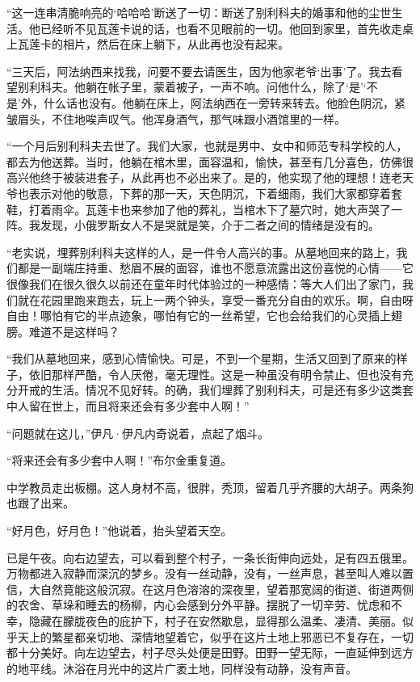 \documentclass[12pt,UTF-8,openany]{ctexbook}
\begin{document}
\begin{normalsize}
    “这一连串清脆响亮的‘哈哈哈’断送了一切：断送了别利科夫的婚事和他的尘世生活。他已经听不见瓦莲卡说的话，也看不见眼前的一切。他回到家里，首先收走桌上瓦莲卡的相片，然后在床上躺下，从此再也没有起来。
    
    “三天后，阿法纳西来找我，问要不要去请医生，因为他家老爷‘出事’了。我去看望别利科夫。他躺在帐子里，蒙着被子，一声不响。问他什么，除了‘是’‘不是’外，什么话也没有。他躺在床上，阿法纳西在一旁转来转去。他脸色阴沉，紧皱眉头，不住地唉声叹气。他浑身酒气，那气味跟小酒馆里的一样。
    
    “一个月后别利科夫去世了。我们大家，也就是男中、女中和师范专科学校的人，都去为他送葬。当时，他躺在棺木里，面容温和，愉快，甚至有几分喜色，仿佛很高兴他终于被装进套子，从此再也不必出来了。是的，他实现了他的理想！连老天爷也表示对他的敬意，下葬的那一天，天色阴沉，下着细雨，我们大家都穿着套鞋，打着雨伞。瓦莲卡也来参加了他的葬礼，当棺木下了墓穴时，她大声哭了一阵。我发现，小俄罗斯女人不是哭就是笑，介于二者之间的情绪是没有的。
    
    “老实说，埋葬别利科夫这样的人，是一件令人高兴的事。从墓地回来的路上，我们都是一副端庄持重、愁眉不展的面容，谁也不愿意流露出这份喜悦的心情——它很像我们在很久很久以前还在童年时代体验过的一种感情：等大人们出了家门，我们就在花园里跑来跑去，玩上一两个钟头，享受一番充分自由的欢乐。啊，自由呀自由！哪怕有它的半点迹象，哪怕有它的一丝希望，它也会给我们的心灵插上翅膀。难道不是这样吗？
    
    “我们从墓地回来，感到心情愉快。可是，不到一个星期，生活又回到了原来的样子，依旧那样严酷，令人厌倦，毫无理性。这是一种虽没有明令禁止、但也没有充分开戒的生活。情况不见好转。的确，我们埋葬了别利科夫，可是还有多少这类套中人留在世上，而且将来还会有多少套中人啊！”
    
    “问题就在这儿，”伊凡·伊凡内奇说着，点起了烟斗。
    
    “将来还会有多少套中人啊！”布尔金重复道。
    
    中学教员走出板棚。这人身材不高，很胖，秃顶，留着几乎齐腰的大胡子。两条狗也跟了出来。
    
    “好月色，好月色！”他说着，抬头望着天空。
    
    已是午夜。向右边望去，可以看到整个村子，一条长街伸向远处，足有四五俄里。万物都进入寂静而深沉的梦乡。没有一丝动静，没有，一丝声息，甚至叫人难以置信，大自然竟能这般沉寂。在这月色溶溶的深夜里，望着那宽阔的街道、街道两侧的农舍、草垛和睡去的杨柳，内心会感到分外平静。摆脱了一切辛劳、忧虑和不幸，隐藏在朦胧夜色的庇护下，村子在安然歇息，显得那么温柔、凄清、美丽。似乎天上的繁星都亲切地、深情地望着它，似乎在这片土地上邪恶已不复存在，一切都十分美好。向左边望去，村子尽头处便是田野。田野一望无际，一直延伸到远方的地平线。沐浴在月光中的这片广袤土地，同样没有动静，没有声音。
    

\end{normalsize}
\end{document}
